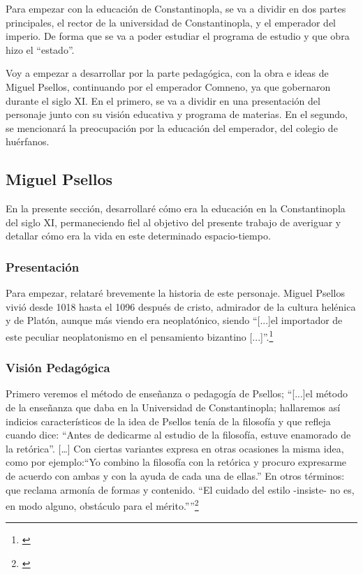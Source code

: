 
	Para empezar con la educación de Constantinopla, se va a dividir en dos partes principales, el rector de la universidad de Constantinopla, y el emperador del imperio. De forma que se va a poder estudiar el programa de estudio y que obra hizo el “estado”.

	Voy a empezar a desarrollar por la parte pedagógica, con la obra e ideas de Miguel Psellos, continuando por el emperador Comneno, ya que gobernaron durante el siglo XI. En el primero, se va a dividir en una presentación del personaje junto con su visión educativa y programa de materias. En el segundo, se mencionará la preocupación por la educación del emperador, del colegio de huérfanos.

\subsection{Miguel Psellos}
	En la presente sección, desarrollaré cómo era la educación en la Constantinopla del siglo XI, permaneciendo fiel al objetivo del presente trabajo de averiguar y detallar cómo era la vida en este determinado espacio-tiempo.

\subsubsection{Presentación}
	Para empezar, relataré brevemente la historia de este personaje. Miguel Psellos vivió desde 1018 hasta el 1096 después de cristo, admirador de la cultura helénica y de Platón, aunque más viendo era neoplatónico, siendo “[...]el importador de este peculiar neoplatonismo en el pensamiento bizantino [...]”.\footnote{\cite[p.~160]{filosofia}}

\subsubsection{Visión Pedagógica}
	Primero veremos el método de enseñanza o pedagogía de Psellos; “[...]el método de la enseñanza que daba en la Universidad de Constantinopla; hallaremos así indicios característicos de la idea de Psellos tenía de la filosofía y que refleja cuando dice: “Antes de dedicarme al estudio de la filosofía, estuve enamorado de la retórica”. […] Con ciertas variantes expresa en otras ocasiones la misma idea, como por ejemplo:“Yo combino la filosofía con la retórica y procuro expresarme de acuerdo con ambas y con la ayuda de cada una de ellas.” En otros términos: que reclama armonía de formas y contenido. “El cuidado del estilo -insiste- no es, en modo alguno, obstáculo para el mérito.””\footnote{\cite[p.~160]{filosofia}}

